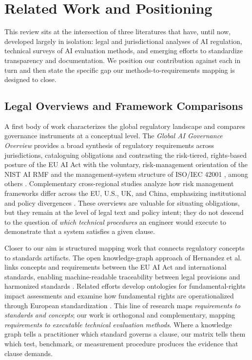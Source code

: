 \section{Related Work and Positioning}
\label{sec:related}

This review sits at the intersection of three literatures that have, until now, developed largely in isolation: legal and jurisdictional analyses of AI regulation, technical surveys of AI evaluation methods, and emerging efforts to standardize transparency and documentation. We position our contribution against each in turn and then state the specific gap our methods-to-requirements mapping is designed to close.

\subsection{Legal Overviews and Framework Comparisons}

A first body of work characterizes the global regulatory landscape and compares governance instruments at a conceptual level. The \textit{Global AI Governance Overview} provides a broad synthesis of regulatory requirements across jurisdictions, cataloguing obligations and contrasting the risk-tiered, rights-based posture of the EU AI Act \cite{euaiact2024} with the voluntary, risk-management orientation of the NIST AI RMF \cite{nist2023airmf} and the management-system structure of ISO/IEC 42001 \cite{iso42001}, among others \cite{global2024governance}. Complementary cross-regional studies analyze how risk management frameworks differ across the EU, U.S., UK, and China, emphasizing institutional and policy divergences \cite{almaamari2025crossregional}. These overviews are valuable for situating obligations, but they remain at the level of legal text and policy intent; they do not descend to the question of \textit{which technical procedures} an engineer would execute to demonstrate that a system satisfies a given clause.

Closer to our aim is structured mapping work that connects regulatory concepts to standards artifacts. The open knowledge-graph approach of Hernandez et al. links concepts and requirements between the EU AI Act and international standards, enabling machine-readable traceability between legal provisions and harmonized standards \cite{hernandez2024knowledgegraph}. Related efforts develop ontologies for fundamental-rights impact assessments \cite{rintamaki2025ontology} and examine how fundamental rights are operationalized through European standardization \cite{hodac2024fundamentalrights, meding2025algorithmicdiscrimination}. This line of research maps \textit{requirements to standards and concepts}; our work is orthogonal and complementary, mapping \textit{requirements to executable technical evaluation methods}. Where a knowledge graph tells a practitioner which standard governs a clause, our matrix tells them which test, benchmark, or measurement procedure produces the evidence that clause demands.

